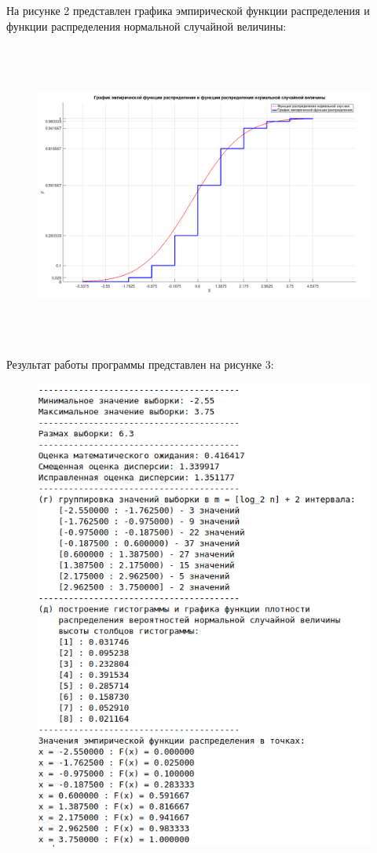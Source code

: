 На рисунке 2 представлен  графика эмпирической функции распределения и функции распределения нормальной случайной величины:
\FloatBarrier
\begin{figure}[h]
	\begin{center}
		\includegraphics[width=\linewidth, height=10cm]{inc/cdf.png}
	\end{center}
\end{figure}
\FloatBarrier

Результат работы программы представлен на рисунке 3:
\FloatBarrier
\begin{figure}[h]
	\begin{center}
		\includegraphics[width=\linewidth]{inc/result.png}
	\end{center}
\end{figure}
\FloatBarrier

